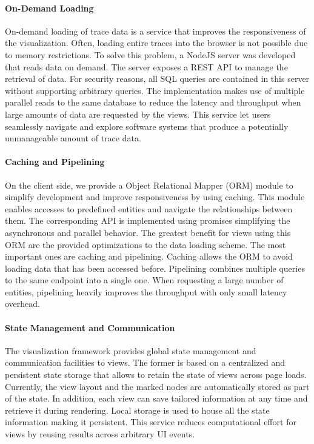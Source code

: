 \paragraph{On-Demand Loading}
On-demand loading of trace data is a service that improves the responsiveness
of the visualization. Often, loading entire traces into the browser is not
possible due to memory restrictions. To solve this problem, a NodeJS server was
developed that reads data on demand. The server exposes a REST \cite{rest} API
to manage the retrieval of data. For security reasons, all SQL queries are
contained in this server without supporting arbitrary queries. The
implementation makes use of multiple parallel reads to the same database to
reduce the latency and throughput when large amounts of data are requested by
the views. This service let users seamlessly navigate and explore software
systems that produce a potentially unmanageable amount of trace data.

\paragraph{Caching and Pipelining}
On the client side, we provide a Object Relational Mapper (ORM) module to
simplify development and improve responsiveness by using caching. This module
enables accesses to predefined entities and navigate the relationships between
them. The corresponding API is implemented using promises \cite{promises}
simplifying the asynchronous and parallel behavior. The greatest benefit for
views using this ORM are the provided optimizations to the data loading scheme.
The most important ones are caching and pipelining. Caching allows the ORM to
avoid loading data that has been accessed before. Pipelining combines multiple
queries to the same endpoint into a single one. When requesting a large number
of entities, pipelining heavily improves the throughput with only small
latency overhead.

\paragraph{State Management and Communication}
The visualization framework provides global state management and communication
facilities to views. The former is based on a centralized and persistent state
storage that allows to retain the state of views across page loads. Currently,
the view layout and the marked nodes are automatically stored as part of the
state. In addition, each view can save tailored information at any time and
retrieve it during rendering. Local storage is used to house all the state
information making it persistent. This service reduces computational effort for
views by reusing results across arbitrary UI events.

